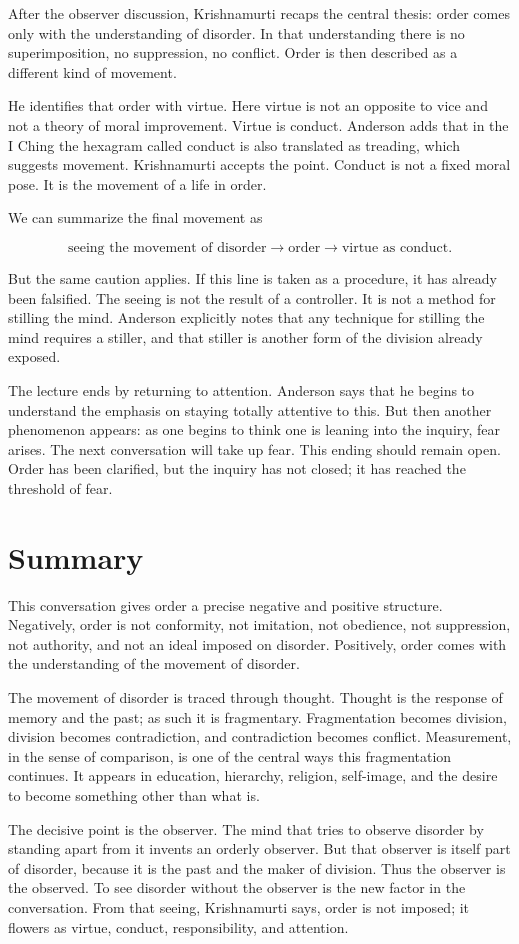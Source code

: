 After the observer discussion, Krishnamurti recaps the central thesis: order comes only with the understanding of disorder. In that understanding there is no superimposition, no suppression, no conflict. Order is then described as a different kind of movement.

He identifies that order with virtue. Here virtue is not an opposite to vice and not a theory of moral improvement. Virtue is conduct. Anderson adds that in the I Ching the hexagram called conduct is also translated as treading, which suggests movement. Krishnamurti accepts the point. Conduct is not a fixed moral pose. It is the movement of a life in order.

We can summarize the final movement as

\begin{equation}
\text{seeing the movement of disorder}
\longrightarrow
\text{order}
\longrightarrow
\text{virtue as conduct}.
\end{equation}

But the same caution applies. If this line is taken as a procedure, it has already been falsified. The seeing is not the result of a controller. It is not a method for stilling the mind. Anderson explicitly notes that any technique for stilling the mind requires a stiller, and that stiller is another form of the division already exposed.

The lecture ends by returning to attention. Anderson says that he begins to understand the emphasis on staying totally attentive to this. But then another phenomenon appears: as one begins to think one is leaning into the inquiry, fear arises. The next conversation will take up fear. This ending should remain open. Order has been clarified, but the inquiry has not closed; it has reached the threshold of fear.

\section{Summary}

This conversation gives order a precise negative and positive structure. Negatively, order is not conformity, not imitation, not obedience, not suppression, not authority, and not an ideal imposed on disorder. Positively, order comes with the understanding of the movement of disorder.

The movement of disorder is traced through thought. Thought is the response of memory and the past; as such it is fragmentary. Fragmentation becomes division, division becomes contradiction, and contradiction becomes conflict. Measurement, in the sense of comparison, is one of the central ways this fragmentation continues. It appears in education, hierarchy, religion, self-image, and the desire to become something other than what is.

The decisive point is the observer. The mind that tries to observe disorder by standing apart from it invents an orderly observer. But that observer is itself part of disorder, because it is the past and the maker of division. Thus the observer is the observed. To see disorder without the observer is the new factor in the conversation. From that seeing, Krishnamurti says, order is not imposed; it flowers as virtue, conduct, responsibility, and attention.